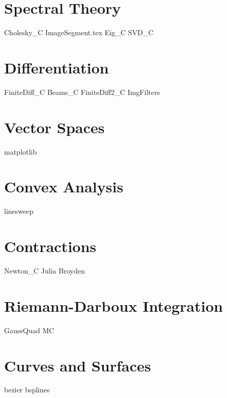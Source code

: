 \documentclass{newsiambook}
\begin{document}
\part{Spectral Theory}
{Cholesky_C}
{ImageSegment.tex}
{Eig_C}
{SVD_C}

\part{Differentiation}
{FiniteDiff_C}
{Beams_C}
{FiniteDiff2_C}
{ImgFilters}

\part{Vector Spaces}
{matplotlib}


\part{Convex Analysis}

{linesweep}

\part{Contractions}
{Newton_C}
{Julia}
{Broyden}

\part{Riemann-Darboux Integration}
{GaussQuad}
{MC}

% 

\part{Curves and Surfaces}
{bezier}
{bsplines}
\end{document}
